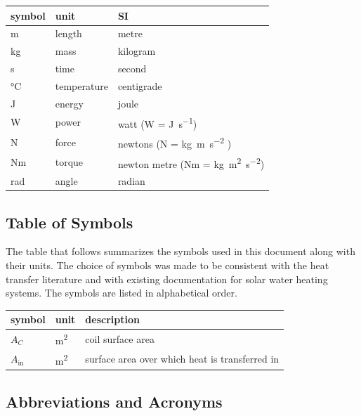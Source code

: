 \documentclass[12pt]{article}
\begin{document}
\renewcommand{\arraystretch}{1.2}
  \noindent \begin{tabular}{l l l} 
    \toprule		
    \textbf{symbol} & \textbf{unit} & \textbf{SI}\\
    \midrule 
    \si{\metre} & length & metre\\
    \si{\kilogram} & mass	& kilogram\\
    \si{\second} & time & second\\
    \si{\celsius} & temperature & centigrade\\
    \si{\joule} & energy & joule\\
    \si{\watt} & power & watt (W = \si{\joule\per\second})\\
    \si{\newton} & force & newtons (N = \si{\kilogram \metre\per\square\second} )\\
    Nm & torque & newton metre (Nm = \si{\kilogram \square\metre\per\square\second})\\
    \si{\radian} & angle & radian\\
    \bottomrule
  \end{tabular}

\subsection{Table of Symbols}

The table that follows summarizes the symbols used in this document along with
their units.  The choice of symbols was made to be consistent with the heat
transfer literature and with existing documentation for solar water heating
systems.  The symbols are listed in alphabetical order.

\renewcommand{\arraystretch}{1.2}
\noindent \begin{longtable*}{l l p{12cm}} \toprule
\textbf{symbol} & \textbf{unit} & \textbf{description}\\
\midrule 
$A_C$ & \si[per-mode=symbol] {\square\metre} & coil surface area
\\
$A_\text{in}$ & \si[per-mode=symbol] {\square\metre} & surface area over 
which heat is transferred in
\\ 
\bottomrule
\end{longtable*}

\subsection{Abbreviations and Acronyms}
\end{document}
